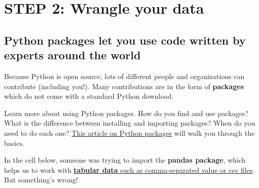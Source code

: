 \documentclass[
  letterpaper,
  DIV=11,
  numbers=noendperiod,
  oneside]{scrreprt}
\begin{document}

\chapter{STEP 2: Wrangle your data}\label{step-2-wrangle-your-data}

\section{\texorpdfstring{Python \textbf{packages} let you use code
written by experts around the
world}{Python packages let you use code written by experts around the world}}\label{python-packages-let-you-use-code-written-by-experts-around-the-world}

Because Python is open source, lots of different people and
organizations can contribute (including you!). Many contributions are in
the form of \textbf{packages} which do not come with a standard Python
download.

\begin{tcolorbox}[enhanced jigsaw, colbacktitle=quarto-callout-color!10!white, opacityback=0, bottomtitle=1mm, toptitle=1mm, bottomrule=.15mm, left=2mm, colframe=quarto-callout-color-frame, leftrule=.75mm, opacitybacktitle=0.6, colback=white, rightrule=.15mm, toprule=.15mm, breakable, titlerule=0mm, title=\textcolor{quarto-callout-color}{\faInfo}\hspace{0.5em}{Read More: Packages need to be installed and imported.}, coltitle=black, arc=.35mm]

Learn more about using Python packages. How do you find and use
packages? What is the difference between installing and importing
packages? When do you need to do each one?
\href{https://www.earthdatascience.org/courses/intro-to-earth-data-science/python-code-fundamentals/use-python-packages/}{This
article on Python packages} will walk you through the basics.

\end{tcolorbox}

In the cell below, someone was trying to import the \textbf{pandas
package}, which helps us to work with
\href{https://www.earthdatascience.org/courses/intro-to-earth-data-science/file-formats/use-text-files/}{\textbf{tabular
data} such as comma-separated value or csv files}. But something's
wrong!
\end{document}
